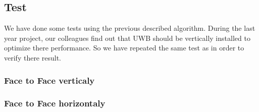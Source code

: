\subsection{Test}
We have done some tests using the previous described algorithm. During the last year project, our colleagues find out that UWB should be vertically installed to optimize there performance. So we have repeated the same test as in order to verify there result. 
\subsubsection{Face to Face verticaly}

\subsubsection{Face to Face horizontaly}
